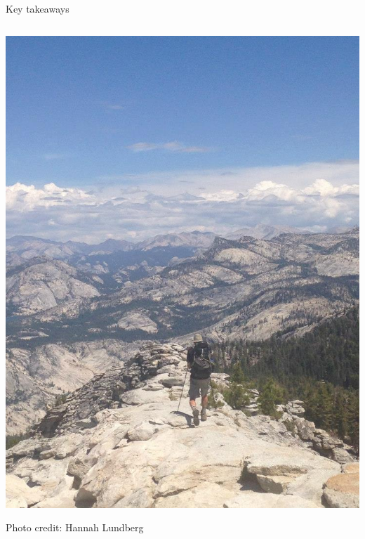 \documentclass{beamer}
\newcommand\bblue[1]{{\color{blue}\textbf{#1}}}
\begin{document}
\begin{frame}{Key takeaways}
\begin{columns}
\begin{column}{.5\textwidth}
\includegraphics[height = .8\textheight]{figs/clouds_rest} \\
\begin{footnotesize}Photo credit: Hannah Lundberg\end{footnotesize}
\end{column}
\end{columns}
\end{frame}
\end{document}
